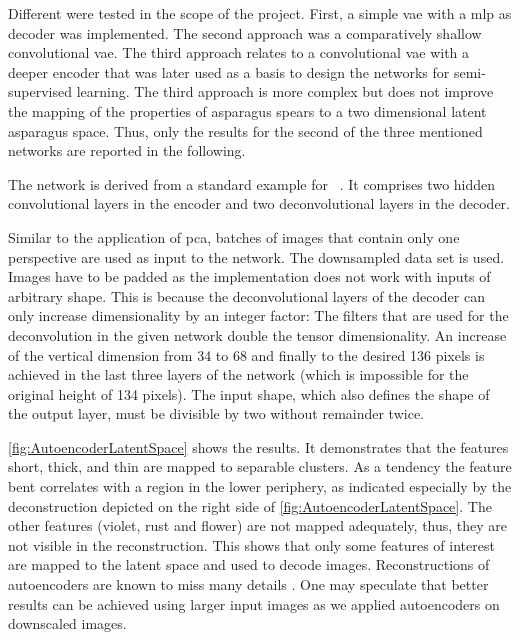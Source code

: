Different  were tested in the scope of the project. First, a simple \acrshort{vae} with a \acrshort{mlp} as decoder was implemented. The second approach was a comparatively shallow convolutional \acrshort{vae}. The third approach relates to a convolutional \acrshort{vae} with a deeper encoder that was later used as a basis to design the networks for semi-supervised learning. The third approach is more complex but does not improve the mapping of the properties of asparagus spears to a two dimensional latent asparagus space. Thus, only the results for the second of the three mentioned networks are reported in the following.

The network is derived from a standard example for ~\citep{keras2020vae}. It comprises two hidden convolutional layers in the encoder and two deconvolutional layers in the decoder.

Similar to the application of \acrshort{pca}, batches of images that contain only one perspective are used as input to the network. The downsampled data set is used. Images have to be padded as the implementation does not work with inputs of arbitrary shape. This is because the deconvolutional layers of the decoder can only increase dimensionality by an integer factor: The filters that are used for the deconvolution in the given network double the tensor dimensionality. An increase of the vertical dimension from 34 to 68 and finally to the desired 136 pixels is achieved in the last three layers of the network (which is impossible for the original height of 134 pixels). The input shape, which also defines the shape of the output layer, must be divisible by two without remainder twice.

\bigskip
\autoref{fig:AutoencoderLatentSpace} shows the results. It demonstrates that the features short, thick, and thin are mapped to separable clusters. As a tendency the feature bent correlates with a region in the lower periphery, as indicated especially by the deconstruction depicted on the right side of \autoref{fig:AutoencoderLatentSpace}. The other features (violet, rust and flower) are not mapped adequately, thus, they are not visible in the reconstruction. This shows that only some features of interest are mapped to the latent space and used to decode images. Reconstructions of autoencoders are known to miss many details \citep{kramer1991nonlinear}. One may speculate that better results can be achieved using larger input images as we applied autoencoders on downscaled images. 

